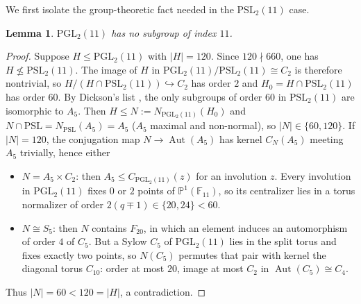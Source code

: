 \documentclass[11pt,a4paper]{amsart}
\newcommand{\PSL}{\mathrm{PSL}}
\newcommand{\PGL}{\mathrm{PGL}}
\newcommand{\F}{\mathbb{F}}
\newcommand{\Aut}{\operatorname{Aut}}
\theoremstyle{plain}
\newtheorem{lemma}[theorem]{Lemma}
\theoremstyle{definition}
\begin{document}
We first isolate the group-theoretic fact needed in the \(\PSL_2(11)\) case.

\begin{lemma}
\label{lem:pgl11}
\(\PGL_2(11)\) has no subgroup of index \(11\).
\end{lemma}

\begin{proof}
Suppose \(H\le\PGL_2(11)\) with \(|H|=120\). Since \(120\nmid 660\), one has \(H\not\le\PSL_2(11)\). The image of \(H\) in \(\PGL_2(11)/\PSL_2(11)\cong C_2\) is therefore nontrivial, so \(H/(H\cap\PSL_2(11))\hookrightarrow C_2\) has order \(2\) and \(H_0=H\cap\PSL_2(11)\) has order \(60\). By Dickson's list \cite[Hauptsatz~II.8.27]{Huppert}, the only subgroups of order \(60\) in \(\PSL_2(11)\) are isomorphic to \(A_5\). Then \(H\le N:=N_{\PGL_2(11)}(H_0)\) and \(N\cap\PSL=N_{\PSL}(A_5)=A_5\) (\(A_5\) maximal and non-normal), so \(|N|\in\{60,120\}\). If \(|N|=120\), the conjugation map \(N\to\Aut(A_5)\) has kernel \(C_N(A_5)\) meeting \(A_5\) trivially, hence either
\begin{itemize}
\item \(N=A_5\times C_2\): then \(A_5\le C_{\PGL_2(11)}(z)\) for an involution \(z\). Every involution in \(\PGL_2(11)\) fixes \(0\) or \(2\) points of \(\mathbb P^1(\F_{11})\), so its centralizer lies in a torus normalizer of order \(2(q\mp1)\in\{20,24\}<60\).
\item \(N\cong S_5\): then \(N\) contains \(F_{20}\), in which an element induces an automorphism of order \(4\) of \(C_5\). But a Sylow \(C_5\) of \(\PGL_2(11)\) lies in the split torus and fixes exactly two points, so \(N(C_5)\) permutes that pair with kernel the diagonal torus \(C_{10}\): order at most \(20\), image at most \(C_2\) in \(\Aut(C_5)\cong C_4\).
\end{itemize}
Thus \(|N|=60<120=|H|\), a contradiction.
\end{proof}
\end{document}
